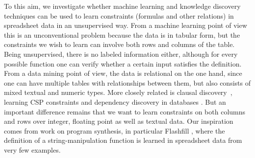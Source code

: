 To this aim,  we investigate whether machine learning and knowledge discovery techniques can be used to learn constraints (formulas and other relations) in spreadsheet data in an unsupervised way.
From a machine learning point of view this is an unconventional problem because the data is in tabular form, but the constraints we wish to learn can involve both rows and columns of the table. Being unsupervised, there is no labeled information either, although for every possible function one can verify whether a certain input satisfies the definition.
From a data mining point of view, the data is relational on the one hand, since one can have multiple tables with relationships between them, but also consists of mixed textual and numeric types. More closely related is clausal discovery~\parencite{claudien,lallouet}, learning CSP constraints \parencite{QUACQ,Conacq,modelseeker} and dependency discovery in databases \parencite{savnik}. But an important difference remains that we want to learn constraints on both columns and rows over integer, floating point as well as textual data.
Our inspiration comes from work on program synthesis, in particular Flashfill \parencite{flashfill}, where the definition of a string-manipulation function is learned in spreadsheet data from very few examples.


